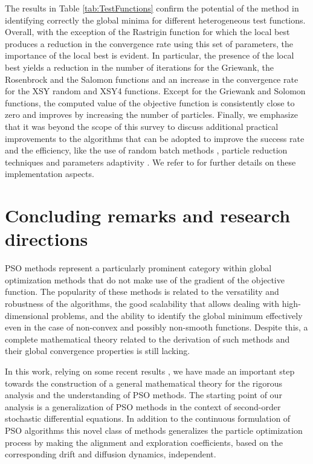\documentclass{ims9x6}
\begin{document}
The results in Table \ref{tab:TestFunctions} confirm the potential of the method in identifying correctly the global minima for different heterogeneous test functions. Overall, with the exception of the Rastrigin function for which  the local best produces a reduction in the convergence rate using this set of parameters, the importance of the local best is evident. In particular, the presence of the local best yields a reduction in the number of iterations for the Griewank, the Rosenbrock and the Salomon functions and an increase in the convergence rate for the XSY random and XSY4 functions. Except for the Griewank and Solomon functions, the computed value of the objective function is consistently close to zero and improves by increasing the number of particles. 
Finally, we emphasize that it was beyond the scope of this survey to discuss additional practical improvements to the algorithms that can be adopted to improve the success rate and the efficiency, like the use of random batch methods \cite{AlPa,carrillo2019consensus,JLJ}, particle reduction techniques \cite{fhps20-2,fornasier2021anisotropic} and parameters adaptivity \cite{poli2007particle,wang2017particle}. 
We refer to \cite{grassi2021consensus} for further details on these implementation aspects.


\section{Concluding remarks and research directions}
PSO methods represent a particularly prominent category within global optimization methods that do not make use of the gradient of the objective function. The popularity of these methods is related to the versatility and robustness of the algorithms, the good scalability that allows dealing with high-dimensional problems, and the ability to identify the global minimum effectively even in the case of non-convex and possibly non-smooth functions. Despite this, a complete mathematical theory related to the derivation of such methods and their global convergence properties is still lacking.

In this work, relying on some recent results \cite{Grassi2021PSO,huang2021mean1,cipriani2021zero,HJK,grassi2021consensus}, we have made an important step towards the construction of a general mathematical theory for the rigorous analysis and the understanding of PSO methods. 
The starting point of our analysis is a generalization of PSO methods in the context of second-order stochastic differential equations. In addition to the continuous formulation of PSO algorithms this novel class of methods generalizes the particle optimization process by making the alignment and exploration coefficients, based on the corresponding drift and diffusion dynamics, independent.
\end{document}
